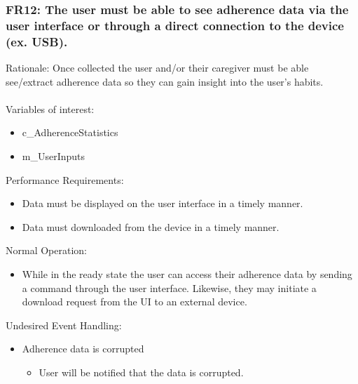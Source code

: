 \documentclass[12pt]{article}
\begin{document}
\subsubsection*{FR12:  The user must be able to see adherence data via the user interface or through a direct connection to the device (ex.  USB).}
Rationale: Once collected the user and/or their caregiver must be able see/extract adherence data so they can gain insight into the user's habits.
\\\\
Variables of interest:
\begin{itemize}[noitemsep,topsep=0pt]
    \item c\_AdherenceStatistics
    \item m\_UserInputs
\end{itemize} 
\bigskip
Performance Requirements:
\begin{itemize}[noitemsep,topsep=0pt]
    \item Data must be displayed on the user interface in a timely manner.
    \item Data must downloaded from the device in a timely manner. 
\end{itemize}
\bigskip
Normal Operation:
\begin{itemize}[noitemsep,topsep=0pt]
    \item While in the ready state the user can access their adherence data by sending a command through the user interface. Likewise, they may initiate a download request from the UI to an external device.
\end{itemize}
\bigskip
Undesired Event Handling:
\begin{itemize}[noitemsep,topsep=0pt]
    \item Adherence data is corrupted
\begin{itemize}
    \item User will be notified that the data is corrupted.
\end{itemize}
\end{itemize}
\bigskip

\end{document}
